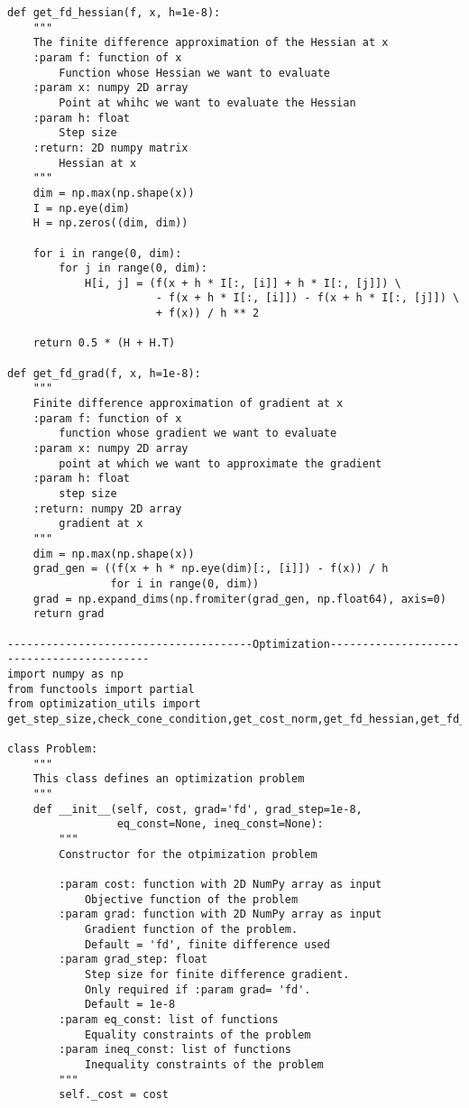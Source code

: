\begin{lstlisting}
def get_fd_hessian(f, x, h=1e-8):
    """
    The finite difference approximation of the Hessian at x
    :param f: function of x
        Function whose Hessian we want to evaluate
    :param x: numpy 2D array
        Point at whihc we want to evaluate the Hessian
    :param h: float
        Step size
    :return: 2D numpy matrix
        Hessian at x
    """
    dim = np.max(np.shape(x))
    I = np.eye(dim)
    H = np.zeros((dim, dim))

    for i in range(0, dim):
        for j in range(0, dim):
            H[i, j] = (f(x + h * I[:, [i]] + h * I[:, [j]]) \
                       - f(x + h * I[:, [i]]) - f(x + h * I[:, [j]]) \
                       + f(x)) / h ** 2

    return 0.5 * (H + H.T)

def get_fd_grad(f, x, h=1e-8):
    """
    Finite difference approximation of gradient at x
    :param f: function of x
        function whose gradient we want to evaluate
    :param x: numpy 2D array
        point at which we want to approximate the gradient
    :param h: float
        step size
    :return: numpy 2D array
        gradient at x 
    """
    dim = np.max(np.shape(x))
    grad_gen = ((f(x + h * np.eye(dim)[:, [i]]) - f(x)) / h
                for i in range(0, dim))
    grad = np.expand_dims(np.fromiter(grad_gen, np.float64), axis=0)
    return grad

--------------------------------------Optimization------------------------------------------
import numpy as np
from functools import partial
from optimization_utils import get_step_size,check_cone_condition,get_cost_norm,get_fd_hessian,get_fd_grad

class Problem:
    """
    This class defines an optimization problem
    """
    def __init__(self, cost, grad='fd', grad_step=1e-8,
                 eq_const=None, ineq_const=None):
        """
        Constructor for the otpimization problem

        :param cost: function with 2D NumPy array as input
            Objective function of the problem
        :param grad: function with 2D NumPy array as input
            Gradient function of the problem.
            Default = 'fd', finite difference used
        :param grad_step: float
            Step size for finite difference gradient.
            Only required if :param grad= 'fd'.
            Default = 1e-8
        :param eq_const: list of functions
            Equality constraints of the problem
        :param ineq_const: list of functions
            Inequality constraints of the problem
        """
        self._cost = cost


\end{lstlisting}
